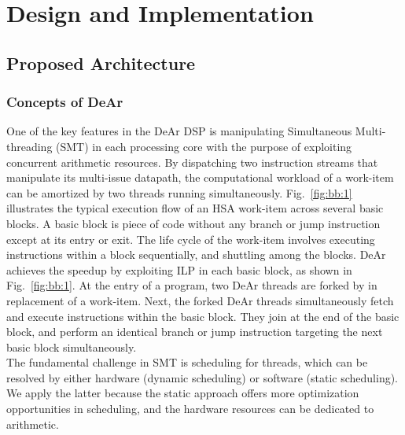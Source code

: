 \chapter{Design and Implementation}
\section{Proposed Architecture}
\subsection{Concepts of DeAr}
\indent 
One of the key features in the DeAr DSP is manipulating Simultaneous Multi-threading (SMT) in each processing core with the purpose of exploiting concurrent arithmetic resources.
By dispatching two instruction streams that manipulate its multi-issue datapath, 
the computational workload of a work-item can be amortized by two threads running simultaneously.
Fig.~\ref{fig:bb:1} illustrates the typical execution flow of an HSA work-item across several basic blocks.
A basic block is piece of code without any branch or jump instruction except at its entry or exit.
The life cycle of the work-item involves executing instructions within a block sequentially, and shuttling among the blocks.
DeAr achieves the speedup by exploiting ILP in each basic block, as shown in Fig.~\ref{fig:bb:1}. 
At the entry of a program, two DeAr threads are forked by in replacement of a work-item.
Next, the forked DeAr threads simultaneously fetch and execute instructions within the basic block.
They join at the end of the basic block, and perform an identical branch or jump instruction targeting the next basic block simultaneously.
\\\indent
The fundamental challenge in SMT is scheduling for threads, 
which can be resolved by either hardware (dynamic scheduling) or software (static scheduling).
We apply the latter because the static approach offers more optimization opportunities in scheduling, 
and the hardware resources can be dedicated to arithmetic.
\vspace{\textfig}
